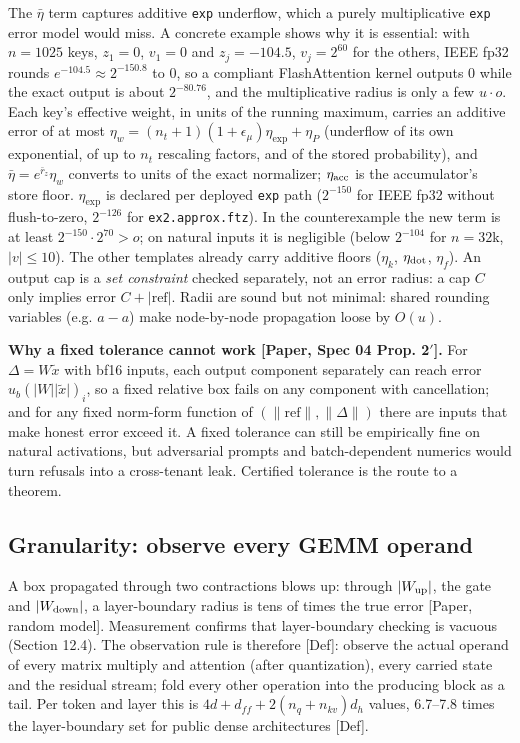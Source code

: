 \documentclass[10pt]{article}
\begin{document}
The $\bar\eta$ term captures additive \texttt{exp} underflow, which a purely multiplicative \texttt{exp} error model would miss. A concrete example shows why it is essential: with $n=1025$ keys, $z_1=0$, $v_1=0$ and $z_j=-104.5$, $v_j=2^{60}$ for the others, IEEE fp32 rounds $e^{-104.5}\approx2^{-150.8}$ to 0, so a compliant FlashAttention kernel outputs 0 while the exact output is about $2^{-80.76}$, and the multiplicative radius is only a few $u\cdot o$. Each key's effective weight, in units of the running maximum, carries an additive error of at most $\eta_w=(n_t+1)(1+\epsilon_\mu)\eta_{\exp}+\eta_P$ (underflow of its own exponential, of up to $n_t$ rescaling factors, and of the stored probability), and $\bar\eta=e^{\bar r_z}\eta_w$ converts to units of the exact normalizer; $\eta_{\rm acc}$ is the accumulator's store floor. $\eta_{\exp}$ is declared per deployed \texttt{exp} path ($2^{-150}$ for IEEE fp32 without flush-to-zero, $2^{-126}$ for \texttt{ex2.\allowbreak{}approx.\allowbreak{}ftz}). In the counterexample the new term is at least $2^{-150}\cdot2^{70}>o$; on natural inputs it is negligible (below $2^{-104}$ for $n=32$k, $\lvert v\rvert\le10$). The other templates already carry additive floors ($\eta_k$, $\eta_{\rm dot}$, $\eta_f$). An output cap is a \emph{set constraint} checked separately, not an error radius: a cap $C$ only implies error $C+\lvert\mathrm{ref}\rvert$. Radii are sound but not minimal: shared rounding variables (e.g. $a-a$) make node-by-node propagation loose by $O(u)$.

\textbf{Why a fixed tolerance cannot work [Paper, Spec 04 Prop. 2$'$].} For $\Delta=W\tilde x$ with bf16 inputs, each output component separately can reach error $u_b(\lvert W\rvert\lvert\tilde x\rvert)_i$, so a fixed relative box fails on any component with cancellation; and for any fixed norm-form function of $(\lVert\mathrm{ref}\rVert,\lVert\Delta\rVert)$ there are inputs that make honest error exceed it. A fixed tolerance can still be empirically fine on natural activations, but adversarial prompts and batch-dependent numerics would turn refusals into a cross-tenant leak. Certified tolerance is the route to a theorem.

\subsection{Granularity: observe every GEMM operand}
A box propagated through two contractions blows up: through $\lvert W_{\rm up}\rvert$, the gate and $\lvert W_{\rm down}\rvert$, a layer-boundary radius is tens of times the true error [Paper, random model]. Measurement confirms that layer-boundary checking is vacuous (Section 12.4). The observation rule is therefore [Def]: observe the actual operand of every matrix multiply and attention (after quantization), every carried state and the residual stream; fold every other operation into the producing block as a tail. Per token and layer this is $4d+d_{ff}+2(n_q+n_{kv})d_h$ values, 6.7--7.8 times the layer-boundary set for public dense architectures [Def].
\end{document}
